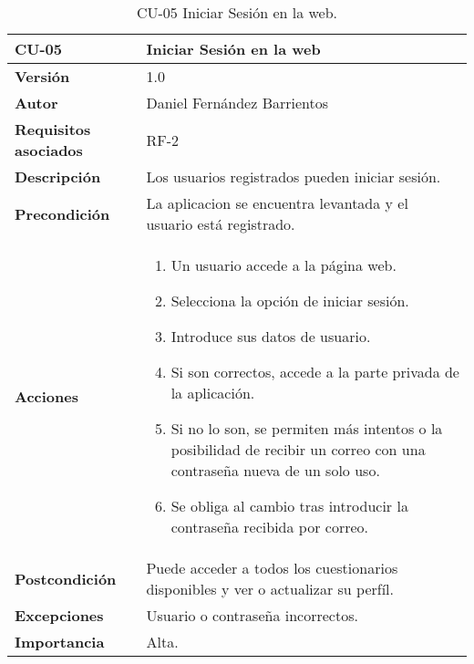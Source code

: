 \begin{table}[p]
	\centering
	\begin{tabularx}{\linewidth}{ p{} p{} }
		\toprule
		\textbf{CU-05}    & \textbf{Iniciar Sesión en la web}\\
		\toprule
		\textbf{Versión}              & 1.0    \\
		\textbf{Autor}                & Daniel Fernández Barrientos \\
		\textbf{Requisitos asociados} & RF-2 \\
		\textbf{Descripción}          & Los usuarios registrados pueden iniciar sesión. \\
		\textbf{Precondición}         & La aplicacion se encuentra levantada y el usuario está registrado. \\
		\textbf{Acciones}             &
		\begin{enumerate}
			\def\labelenumi{\arabic{enumi}.}
			\tightlist
			\item Un usuario accede a la página web.
			\item Selecciona la opción de iniciar sesión.
			\item Introduce sus datos de usuario.
			\item Si son correctos, accede a la parte privada de la aplicación.
			\item Si no lo son, se permiten más intentos o la posibilidad de recibir un correo con una contraseña nueva de un solo uso.
			\item Se obliga al cambio tras introducir la contraseña recibida por correo.
		\end{enumerate}\\
		\textbf{Postcondición}        & Puede acceder a todos los cuestionarios disponibles y ver o actualizar su perfíl. \\
		\textbf{Excepciones}          & Usuario o contraseña incorrectos. \\
		\textbf{Importancia}          & Alta. \\
		\bottomrule
	\end{tabularx}
	\caption{CU-05 Iniciar Sesión en la web.}
\end{table}

